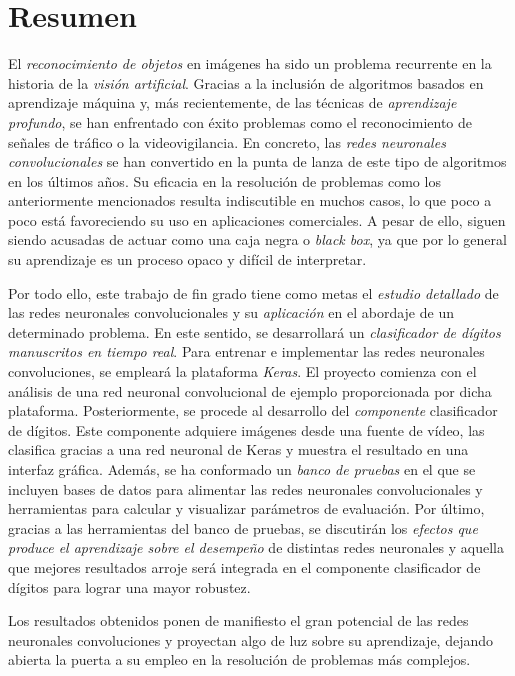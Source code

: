 \chapter*{Resumen}
El \emph{reconocimiento de objetos} en imágenes ha sido un problema recurrente en la historia de la \emph{visión artificial}. Gracias a la inclusión de algoritmos basados en aprendizaje máquina y, más recientemente, de las técnicas de \emph{aprendizaje profundo}, se han enfrentado con éxito problemas como el reconocimiento de señales de tráfico o la videovigilancia. En concreto, las \emph{redes neuronales convolucionales} se han convertido en la punta de lanza de este tipo de algoritmos en los últimos años. Su eficacia en la resolución de problemas como los anteriormente mencionados resulta indiscutible en muchos casos, lo que poco a poco está favoreciendo su uso en aplicaciones comerciales. A pesar de ello, siguen siendo acusadas de actuar como una caja negra o \emph{black box}, ya que por lo general su aprendizaje es un proceso opaco y difícil de interpretar.

Por todo ello, este trabajo de fin grado tiene como metas el \emph{estudio detallado} de las redes neuronales convolucionales y su \emph{aplicación} en el abordaje de un determinado problema. En este sentido, se desarrollará un \emph{clasificador de dígitos manuscritos en tiempo real}. Para entrenar e implementar las redes neuronales convoluciones, se empleará la plataforma \emph{Keras}. El proyecto comienza con el análisis de una red neuronal convolucional de ejemplo proporcionada por dicha plataforma. Posteriormente, se procede al desarrollo del \emph{componente} clasificador de dígitos. Este componente adquiere imágenes desde una fuente de vídeo, las clasifica gracias a una red neuronal de Keras y muestra el resultado en una interfaz gráfica. Además, se ha conformado un \emph{banco de pruebas} en el que se incluyen bases de datos para alimentar las redes neuronales convolucionales y herramientas para calcular y visualizar parámetros de evaluación. Por último, gracias a las herramientas del banco de pruebas, se discutirán los \emph{efectos que produce el aprendizaje sobre el desempeño} de distintas redes neuronales y aquella que mejores resultados arroje será integrada en el componente clasificador de dígitos para lograr una mayor robustez.

Los resultados obtenidos ponen de manifiesto el gran potencial de las redes neuronales convoluciones y proyectan algo de luz sobre su aprendizaje, dejando abierta la puerta a su empleo en la resolución de problemas más complejos.